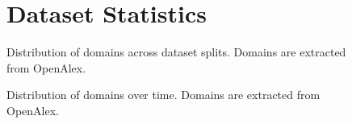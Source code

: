 \begin{figure}
\begin{minipage}{\textwidth}
  \centering
  
\end{minipage}
\end{figure}

\begin{figure}
\begin{minipage}{\textwidth}
  \centering
  
\end{minipage}
\end{figure}

\begin{figure}
\begin{minipage}{\textwidth}
  \centering
  
\end{minipage}
\end{figure}

\renewcommand{\sparqlbasicstyle}{\small\tt}


\FloatBarrier

\begin{figure}[!ht]
  \section{Dataset Statistics}\label{sec:dataset_stats_appendix}
  \begin{minipage}{\textwidth}
  \centering
  
  \caption{Distribution of domains across dataset splits. Domains are extracted from OpenAlex.}
\end{minipage}
\end{figure}

\FloatBarrier

\begin{figure}[!ht]
\begin{minipage}{\textwidth}
  \centering
  
  \caption{Distribution of domains over time. Domains are extracted from OpenAlex.}
\end{minipage}
\end{figure}


